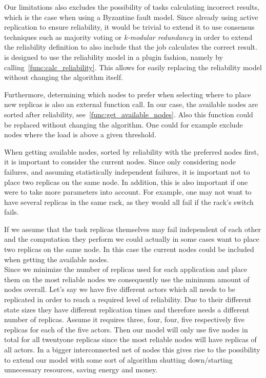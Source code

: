 \documentclass{cslthse-msc}
\begin{document}
Our limitations also excludes the possibility of tasks calculating incorrect results, which is the case when using a Byzantine fault model. Since already using active replication to ensure reliability, it would be trivial to extend it to use consensus techniques such as majority voting or \emph{k-modular redundancy} in order to extend the reliability definition to also include that the job calculates the correct result.
\\

 is designed to use the reliability model in a plugin fashion, namely by calling~\cref{func:calc_reliability}. This allows for easily replacing the reliability model without changing the algorithm itself.

Furthermore, determining which nodes to prefer when selecting where to place new replicas is also an external function call. In our case, the available nodes are sorted after reliability, see~\cref{func:get_available_nodes}. Also this function could be replaced without changing the algorithm. One could for example exclude nodes where the load is above a given threshold.

When getting available nodes, sorted by reliability with the preferred nodes first, it is important to consider the current nodes. Since only considering node failures, and assuming statistically independent failures, it is important not to place two replicas on the same node. In addition, this is also important if one were to take more parameters into account. For example, one may not want to have several replicas in the same rack, as they would all fail if the rack's switch fails.

If we assume that the task replicas themselves may fail independent of each other and the computation they perform we could actually in some cases want to place two replicas on the same node. In this case the current nodes could be included when getting the available nodes.
\\

Since we minimize the number of replicas used for each application and place them on the most reliable nodes we consequently use the minimum amount of nodes overall. Let's say we have five different actors which all needs to be replicated in order to reach a required level of reliability. Due to their different state sizes they have different replication times and therefore needs a different number of replicas. Assume it requires three, four, four, five respectively five replicas for each of the five actors. Then our model will only use five nodes in total for all twentyone replicas since the most reliable nodes will have replicas of all actors. In a bigger interconnected net of nodes this gives rise to the possibility to extend our model with some sort of algorithm shutting down/starting unnecessary resources, saving energy and money.
\end{document}
